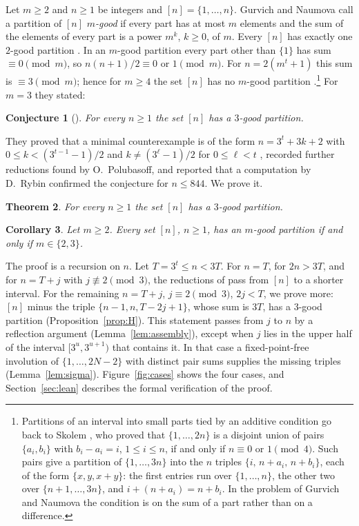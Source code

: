 \documentclass[preprint,12pt]{elsarticle}
\newtheorem{theorem}{Theorem}[section]
\newtheorem{corollary}[theorem]{Corollary}
\newtheorem{conjecture}[theorem]{Conjecture}
\theoremstyle{definition}
\begin{document}
Let $m\ge2$ and $n\ge1$ be integers and $[n]=\{1,\dots,n\}$. Gurvich and Naumova \cite{GN} call a partition of $[n]$ \emph{$m$-good} if every part has at most $m$ elements and the sum of the elements of every part is a power $m^k$, $k\ge0$, of $m$. Every $[n]$ has exactly one $2$-good partition \cite[Proposition~1]{GN}. In an $m$-good partition every part other than $\{1\}$ has sum $\equiv0\pmod m$, so $n(n+1)/2\equiv0$ or $1\pmod m$. For $n=2(m^t+1)$ this sum is $\equiv3\pmod m$; hence for $m\ge4$ the set $[n]$ has no $m$-good partition \cite[Observation~1]{GN}.\footnote{Partitions of an interval into small parts tied by an additive condition go back to Skolem \cite{Sko57}, who proved that $\{1,\dots,2n\}$ is a disjoint union of pairs $\{a_i,b_i\}$ with $b_i-a_i=i$, $1\le i\le n$, if and only if $n\equiv0$ or $1\pmod4$. Such pairs give a partition of $\{1,\dots,3n\}$ into the $n$ triples $\{i,\,n+a_i,\,n+b_i\}$, each of the form $\{x,y,x+y\}$: the first entries run over $\{1,\dots,n\}$, the other two over $\{n+1,\dots,3n\}$, and $i+(n+a_i)=n+b_i$. In the problem of Gurvich and Naumova the condition is on the sum of a part rather than on a difference.} For $m=3$ they stated:

\begin{conjecture}[{\cite[Conjecture~1]{GN}}]\label{conj:gn}
For every $n\ge1$ the set $[n]$ has a $3$-good partition.
\end{conjecture}

They proved that a minimal counterexample is of the form $n=3^t+3k+2$ with $0\le k<(3^{t-1}-1)/2$ and $k\ne(3^\ell-1)/2$ for $0\le\ell<t$ \cite[Theorem~1]{GN}, recorded further reductions found by O.~Polubasoff, and reported that a computation by D.~Rybin confirmed the conjecture for $n\le844$. We prove it.

\begin{theorem}\label{thm:main}
For every $n\ge1$ the set $[n]$ has a $3$-good partition.
\end{theorem}

\begin{corollary}\label{cor:m}
Let $m\ge2$. Every set $[n]$, $n\ge1$, has an $m$-good partition if and only if $m\in\{2,3\}$.
\end{corollary}

The proof is a recursion on $n$. Let $T=3^t\le n<3T$. For $n=T$, for $2n>3T$, and for $n=T+j$ with $j\not\equiv2\pmod 3$, the reductions of \cite[Section~2]{GN} pass from $[n]$ to a shorter interval. For the remaining $n=T+j$, $j\equiv2\pmod3$, $2j<T$, we prove more: $[n]$ minus the triple $\{n-1,n,T-2j+1\}$, whose sum is $3T$, has a $3$-good partition (Proposition~\ref{prop:H}). This statement passes from $j$ to $n$ by a reflection argument (Lemma~\ref{lem:assembly}), except when $j$ lies in the upper half of the interval $[3^u,3^{u+1})$ that contains it. In that case a fixed-point-free involution of $\{1,\dots,2N-2\}$ with distinct pair sums supplies the missing triples (Lemma~\ref{lem:sigma}). Figure~\ref{fig:cases} shows the four cases, and Section~\ref{sec:lean} describes the formal verification of the proof.
\end{document}
